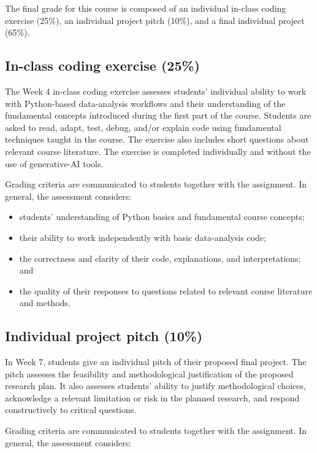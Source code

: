 The final grade for this course is composed of an individual in-class coding exercise (25\%), an individual project pitch (10\%), and a final individual project (65\%).

\subsection*{In-class coding exercise (25\%)}

The Week 4 in-class coding exercise assesses students' individual ability to work with Python-based data-analysis workflows and their understanding of the fundamental concepts introduced during the first part of the course. Students are asked to read, adapt, test, debug, and/or explain code using fundamental techniques taught in the course. The exercise also includes short questions about relevant course literature. The exercise is completed individually and without the use of generative-AI tools.

Grading criteria are communicated to students together with the assignment. In general, the assessment considers:

\begin{itemize}
    \item students' understanding of Python basics and fundamental course concepts;
    \item their ability to work independently with basic data-analysis code;
    \item the correctness and clarity of their code, explanations, and interpretations; and
    \item the quality of their responses to questions related to relevant course literature and methods.
\end{itemize}

\subsection*{Individual project pitch (10\%)}

In Week 7, students give an individual pitch of their proposed final project. The pitch assesses the feasibility and methodological justification of the proposed research plan. It also assesses students' ability to justify methodological choices, acknowledge a relevant limitation or risk in the planned research, and respond constructively to critical questions.

Grading criteria are communicated to students together with the assignment. In general, the assessment considers:

